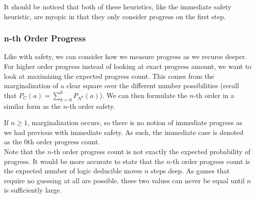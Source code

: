 It should be noticed that both of these heuristics, like the immediate safety heuristic, are myopic in that they only consider progress on the first step. 

\subsubsection*{n-th Order Progress}

Like with safety, we can consider how we measure progress as we recurse deeper. For higher order progress instead of looking at exact progress amount, we want to look at maximizing the expected progress count. This comes from the marginalization of a clear square over the different number possibilities (recall that $P_C(a)=\sum_{k=0}^8P_{N^k}(a)$). We can then formulate the $n$-th order in a similar form as the $n$-th order safety.
\phantom{.}

If $n\geq 1$, marginalization occurs, so there is no notion of immediate progress as we had previous with immediate safety. As such, the immediate case is denoted as the 0th order progress count.\\

Note that the $n$-th order progress count is not exactly the expected probability of progress. It would be more accurate to state that the $n$-th order progress count is the expected number of logic deducible moves $n$ steps deep. As games that require no guessing at all are possible, these two values can never be equal until $n$ is sufficiently large.\\

